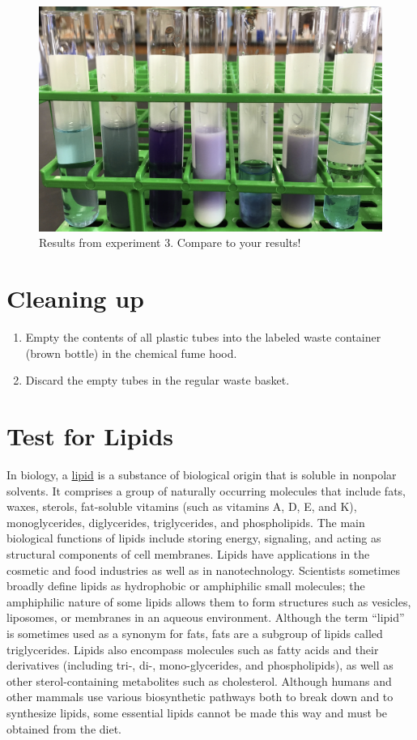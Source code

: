\begin{figure}

{\centering \includegraphics[width=0.7\linewidth]{./figures/chem_aspects/Results_exp_3}

}

\caption{Results from experiment 3. Compare to your results!}\label{fig:exp3}
\end{figure}

\section{Cleaning up}\label{cleaning-up}

\begin{enumerate}
\def\labelenumi{\arabic{enumi}.}
\tightlist
\item
  Empty the contents of all plastic tubes into the labeled waste
  container (brown bottle) in the chemical fume hood.
\item
  Discard the empty tubes in the regular waste basket.
\end{enumerate}

\section{Test for Lipids}\label{test-for-lipids}

In biology, a \href{https://en.wikipedia.org/wiki/Lipid}{lipid} is a
substance of biological origin that is soluble in nonpolar solvents. It
comprises a group of naturally occurring molecules that include fats,
waxes, sterols, fat-soluble vitamins (such as vitamins A, D, E, and K),
monoglycerides, diglycerides, triglycerides, and phospholipids. The main
biological functions of lipids include storing energy, signaling, and
acting as structural components of cell membranes. Lipids have
applications in the cosmetic and food industries as well as in
nanotechnology. Scientists sometimes broadly define lipids as
hydrophobic or amphiphilic small molecules; the amphiphilic nature of
some lipids allows them to form structures such as vesicles, liposomes,
or membranes in an aqueous environment. Although the term ``lipid'' is
sometimes used as a synonym for fats, fats are a subgroup of lipids
called triglycerides. Lipids also encompass molecules such as fatty
acids and their derivatives (including tri-, di-, mono-glycerides, and
phospholipids), as well as other sterol-containing metabolites such as
cholesterol. Although humans and other mammals use various biosynthetic
pathways both to break down and to synthesize lipids, some essential
lipids cannot be made this way and must be obtained from the diet.

